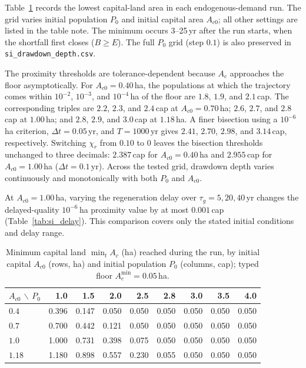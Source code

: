 \documentclass[11pt,a4paper]{article}
\newcommand{\Acmin}{A_c^{\min}}
\begin{document}
Table~\ref{tab:si_drawdown} records the lowest capital-land area in each endogenous-demand run. The grid varies initial population $P_0$ and initial capital area $A_{c0}$; all other settings are listed in the table note. The minimum occurs 3--25\,yr after the run starts, when the shortfall first closes ($B\ge E$). The full $P_0$ grid (step $0.1$) is also preserved in \texttt{si\_drawdown\_depth.csv}.

The proximity thresholds are tolerance-dependent because $A_c$ approaches the floor asymptotically. For $A_{c0}=0.40$\,ha, the populations at which the trajectory comes within $10^{-2}$, $10^{-3}$, and $10^{-4}$\,ha of the floor are $1.8$, $1.9$, and $2.1$\,cap. The corresponding triples are $2.2$, $2.3$, and $2.4$\,cap at $A_{c0}=0.70$\,ha; $2.6$, $2.7$, and $2.8$\,cap at $1.00$\,ha; and $2.8$, $2.9$, and $3.0$\,cap at $1.18$\,ha. A finer bisection using a $10^{-6}$\,ha criterion, $\Delta t=0.05$\,yr, and $T=1000$\,yr gives $2.41$, $2.70$, $2.98$, and $3.14$\,cap, respectively. Switching $\chi_r$ from $0.10$ to $0$ leaves the bisection thresholds unchanged to three decimals: $2.387$\,cap for $A_{c0}=0.40$\,ha and $2.955$\,cap for $A_{c0}=1.00$\,ha ($\Delta t=0.1$\,yr). Across the tested grid, drawdown depth varies continuously and monotonically with both $P_0$ and $A_{c0}$.

At $A_{c0}=1.00$\,ha, varying the regeneration delay over $\tau_g=5,20,40$\,yr changes the delayed-quality $10^{-6}$\,ha proximity value by at most $0.001$\,cap (Table~\ref{tab:si_delay}). This comparison covers only the stated initial conditions and delay range.
\par\pagebreak

\begin{table}[htbp]
\centering\small
\caption{Minimum capital land $\min_tA_c$ (ha) reached during the run, by initial capital $A_{c0}$ (rows, ha) and initial population $P_0$ (columns, cap); typed floor $\Acmin=0.05$\,ha.}
\label{tab:si_drawdown}
\begin{tabular}{lrrrrrrrr}
\toprule
$A_{c0}$ $\backslash$ $P_0$ & 1.0 & 1.5 & 2.0 & 2.5 & 2.8 & 3.0 & 3.5 & 4.0 \\
\midrule
$0.4$ & 0.396 & 0.147 & 0.050 & 0.050 & 0.050 & 0.050 & 0.050 & 0.050 \\
$0.7$ & 0.700 & 0.442 & 0.121 & 0.050 & 0.050 & 0.050 & 0.050 & 0.050 \\
$1.0$ & 1.000 & 0.731 & 0.398 & 0.075 & 0.050 & 0.050 & 0.050 & 0.050 \\
$1.18$ & 1.180 & 0.898 & 0.557 & 0.230 & 0.055 & 0.050 & 0.050 & 0.050 \\
\bottomrule
\end{tabular}
\end{table}
\end{document}
